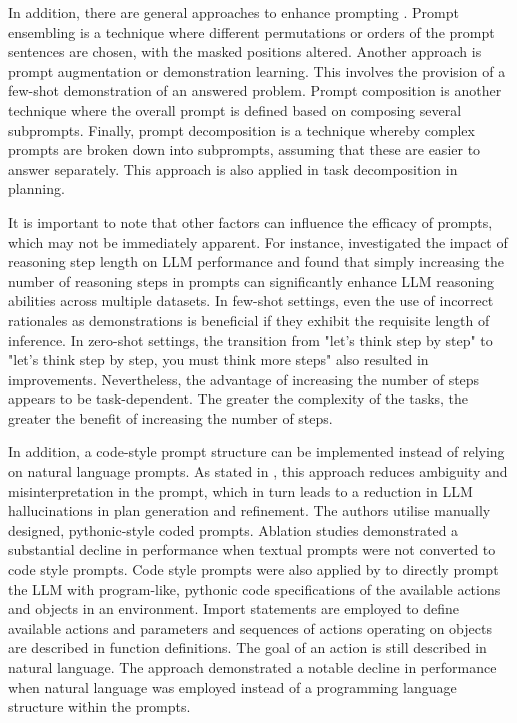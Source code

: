 \documentclass{article}
\begin{document}
In addition, there are general approaches to enhance prompting \cite{liu_pre-train_2021}. 
Prompt ensembling is a technique where different permutations or orders of the prompt sentences are chosen, with the masked positions altered. 
Another approach is prompt augmentation or demonstration learning. This involves the provision of a few-shot demonstration of an answered problem. 
Prompt composition is another technique where the overall prompt is defined based on composing several subprompts. 
Finally, prompt decomposition is a technique whereby complex prompts are broken down into subprompts, assuming that these are easier to answer separately. This approach is also applied in task decomposition in planning.



It is important to note that other factors can influence the efficacy of prompts, which may not be immediately apparent. For instance, \cite{jin_impact_2024} investigated the impact of reasoning step length on LLM performance and found that simply increasing the number of reasoning steps in prompts can significantly enhance LLM reasoning abilities across multiple datasets.
In few-shot settings, even the use of incorrect rationales as demonstrations is beneficial if they exhibit the requisite length of inference. In zero-shot settings, the transition from "let's think step by step" to "let's think step by step, you must think more steps" also resulted in improvements. Nevertheless, the advantage of increasing the number of steps appears to be task-dependent. The greater the complexity of the tasks, the greater the benefit of increasing the number of steps.

In addition, a code-style prompt structure can be implemented instead of relying on natural language prompts. As stated in \cite{sun_adaplanner_2023-1}, this approach reduces ambiguity and misinterpretation in the prompt, which in turn leads to a reduction in LLM hallucinations in plan generation and refinement. The authors utilise manually designed, pythonic-style coded prompts. Ablation studies demonstrated a substantial decline in performance when textual prompts were not converted to code style prompts. Code style prompts were also applied by \cite{singh_progprompt_2023} to directly prompt the LLM with program-like, pythonic code specifications of the available actions and objects in an environment. Import statements are employed to define available actions and parameters and sequences of actions operating on objects are described in function definitions. The goal of an action is still described in natural language. The approach demonstrated a notable decline in performance when natural language was employed instead of a programming language structure within the prompts.
\end{document}
